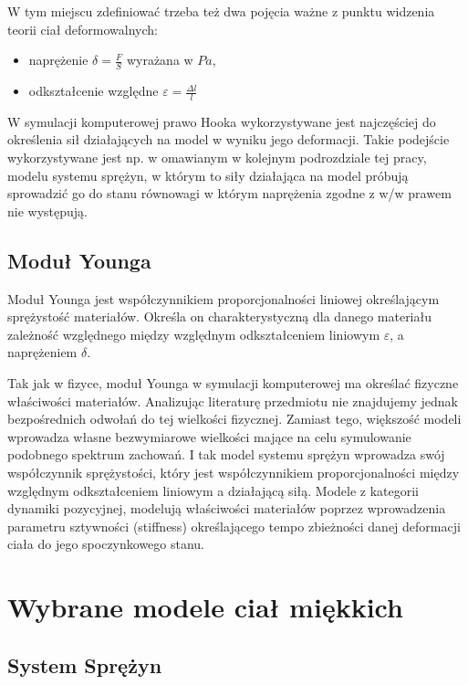 W tym miejscu zdefiniować trzeba też dwa pojęcia ważne z punktu widzenia teorii
ciał deformowalnych:
\begin{itemize}
\item naprężenie $\delta = \frac{F}{S}$ wyrażana w $Pa$,
\item odkształcenie względne $\varepsilon = \frac{\Delta l}{l}$
\end{itemize}
 
W symulacji komputerowej prawo Hooka wykorzystywane jest najczęściej do określenia sił
działających na model w wyniku jego deformacji. Takie podejście wykorzystywane
jest np. w omawianym w kolejnym podrozdziale tej pracy, modelu systemu
sprężyn, w którym to siły działająca na model próbują sprowadzić go do stanu
równowagi w którym naprężenia zgodne z w/w prawem nie występują.

\subsection{Moduł Younga}
Moduł Younga jest współczynnikiem proporcjonalności liniowej określającym
sprężystość materiałów. Określa on charakterystyczną dla danego materiału
zależność względnego między względnym odkształceniem liniowym $\varepsilon$, a
naprężeniem $\delta$.

Tak jak w fizyce, moduł Younga w symulacji komputerowej ma określać fizyczne
właściwości materiałów. Analizując literaturę przedmiotu nie znajdujemy jednak 
bezpośrednich odwołań do tej wielkości fizycznej. Zamiast tego, większość modeli wprowadza
własne bezwymiarowe wielkości mające na celu symulowanie podobnego spektrum
zachowań. I tak model systemu sprężyn wprowadza swój współczynnik
sprężystości, który jest współczynnikiem proporcjonalności między względnym
odkształceniem liniowym a działającą siłą. Modele z kategorii dynamiki
pozycyjnej, modelują właściwości materiałów poprzez wprowadzenia parametru
sztywności (stiffness) określającego tempo zbieżności danej deformacji ciała do jego
spoczynkowego stanu.

\section{Wybrane modele ciał miękkich}


\subsection{System Sprężyn}

